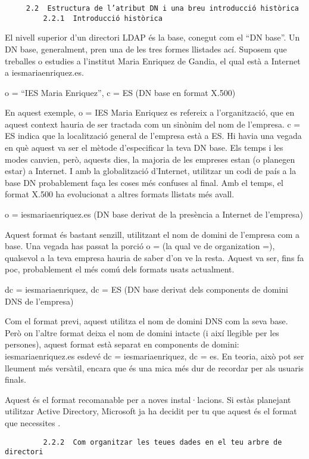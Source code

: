 \documentclass[
  12 pt,
  a4paper,
]{article}
\begin{document}
\begin{verbatim}
     2.2  Estructura de l’atribut DN i una breu introducció històrica
         2.2.1  Introducció històrica
\end{verbatim}

El nivell superior d'un directori LDAP és la base, conegut com el ``DN
base''. Un DN base, generalment, pren una de les tres formes llistades
ací. Suposem que treballes o estudies a l'institut Maria Enriquez de
Gandia, el qual està a Internet a iesmariaenriquez.es.

o = ``IES Maria Enriquez'', c = ES (DN base en format X.500)

En aquest exemple, o = IES Maria Enriquez es refereix a l'organització,
que en aquest context hauria de ser tractada com un sinònim del nom de
l'empresa. c = ES indica que la localització general de l'empresa està a
ES. Hi havia una vegada en què aquest va ser el mètode d'especificar la
teva DN base. Els temps i les modes canvien, però, aquests dies, la
majoria de les empreses estan (o planegen estar) a Internet. I amb la
globalització d'Internet, utilitzar un codi de país a la base DN
probablement faça les coses més confuses al final. Amb el temps, el
format X.500 ha evolucionat a altres formats llistats més avall.

o = iesmariaenriquez.es (DN base derivat de la presència a Internet de
l'empresa)

Aquest format és bastant senzill, utilitzant el nom de domini de
l'empresa com a base. Una vegada has passat la porció o = (la qual ve de
organization =), qualsevol a la teva empresa hauria de saber d'on ve la
resta. Aquest va ser, fins fa poc, probablement el més comú dels formats
usats actualment.

dc = iesmariaenriquez, dc = ES (DN base derivat dels components de
domini DNS de l'empresa)

Com el format previ, aquest utilitza el nom de domini DNS com la seva
base. Però on l'altre format deixa el nom de domini intacte (i així
llegible per les persones), aquest format està separat en components de
domini: iesmariaenriquez.es esdevé dc = iesmariaenriquez, dc = es. En
teoria, això pot ser lleument més versàtil, encara que és una mica més
dur de recordar per als usuaris finals.

Aquest és el format recomanable per a noves instal·lacions. Si estàs
planejant utilitzar Active Directory, Microsoft ja ha decidit per tu que
aquest és el format que necessites .

\begin{verbatim}
         2.2.2  Com organitzar les teues dades en el teu arbre de directori
\end{verbatim}
\end{document}
